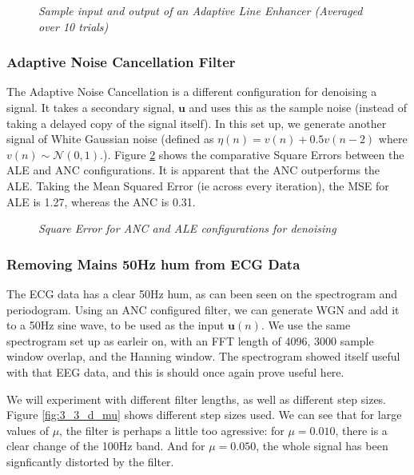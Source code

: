 \documentclass[./main.tex]{subfiles}
\begin{document}
\begin{figure}[h]
\centering 
\resizebox{\textwidth}{!}{}
\caption{\textit{Sample input and output of an Adaptive Line Enhancer (Averaged over 10 trials)}}
\label{fig:3_3_b_overview}
\end{figure}


\subsubsection{Adaptive Noise Cancellation Filter}

The Adaptive Noise Cancellation is a different configuration for denoising a signal. It takes a secondary signal, $\mathbf{u}$ and uses this as the sample noise (instead of taking a delayed copy of the signal itself). In this set up, we generate another signal of White Gaussian noise (defined as $ \eta(n) = v(n) + 0.5v(n-2) $ where $v(n) \sim \mathcal{N}(0,1) $.). Figure \ref{fig:3_3_c} shows the comparative Square Errors between the ALE and ANC configurations. It is apparent that the ANC outperforms the ALE. Taking the Mean Squared Error (ie across every iteration), the MSE for ALE is 1.27, whereas the ANC is 0.31.

\begin{figure}[h]
	\centering 
	\resizebox{\textwidth}{!}{}
	\caption{\textit{Square Error for ANC and ALE configurations for denoising}}
	\label{fig:3_3_c}
\end{figure}

\subsubsection{Removing Mains 50Hz hum from ECG Data}

The ECG data has a clear 50Hz hum, as can been seen on the spectrogram and periodogram. Using an ANC configured filter, we can generate WGN and add it to a 50Hz sine wave, to be used as the input $ \mathbf{u}(n) $. We use the same spectrogram set up as earleir on, with an FFT length of 4096, 3000 sample window overlap, and the Hanning window. The spectrogram showed itself useful with that EEG data, and this is should once again prove useful here.

We will experiment with different filter lengths, as well as different step sizes. Figure \ref{fig:3_3_d_mu} shows different step sizes used. We can see that for large values of $ \mu $, the filter is perhaps a little too agressive: for $ \mu = 0.010 $, there is a clear change of the 100Hz band. And for $ \mu = 0.050$, the whole signal has been signficantly distorted by the filter.
\end{document}
